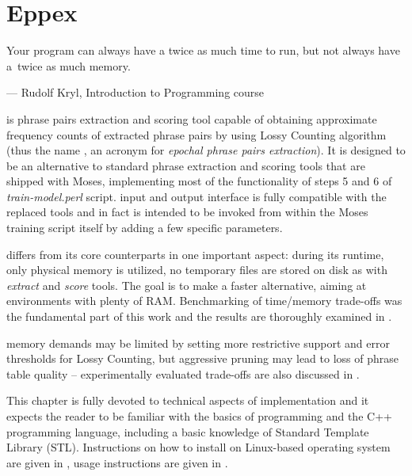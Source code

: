 
\chapter{Eppex}
\label{chap:eppex}

\setlength{\epigraphwidth}{1.0\textwidth}
\epigraph{Your program can always have a twice as much time to run, but not always have a~twice as much memory.}{--- Rudolf Kryl, Introduction to Programming course}

\Eppex{} is phrase pairs extraction and scoring tool capable of obtaining approximate
frequency counts of extracted phrase pairs by using Lossy Counting algorithm
(thus the name \eppex{}, an acronym for \emph{epochal phrase pairs extraction}).
It is designed to be an alternative to standard phrase extraction and scoring tools that
are shipped with Moses, implementing most of the functionality of steps 5 and 6 of
\emph{train-model.perl} script.
\Eppex{} input and output interface is fully compatible with the replaced tools
and \eppex{} in fact is intended to be invoked from within the Moses training script itself
by adding a few specific parameters.

\Eppex{} differs from its core counterparts in one important aspect: during its runtime,
only physical memory is utilized, no temporary files are stored on disk as with \emph{extract}
and \emph{score} tools.
The goal is to make \eppex{} a faster alternative, aiming at environments with plenty of RAM.
Benchmarking of time/memory trade-offs was the fundamental part of this work and the results are
thoroughly examined in .

\Eppex{} memory demands may be limited by setting more restrictive support and error thresholds
for Lossy Counting, but aggressive pruning may lead to loss of phrase table quality --
experimentally evaluated trade-offs are also discussed in .

This chapter is fully devoted to technical aspects of implementation and it expects the reader
to be familiar with the basics of programming and the C++ programming language, including
a basic knowledge of Standard Template Library (STL).
Instructions on how to install \eppex{} on Linux-based operating system are given in
, usage instructions are given in .


